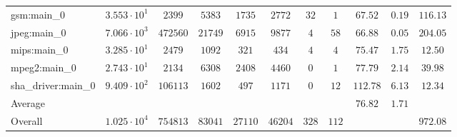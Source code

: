 \begin{tabular}{|l|c|c|c|c|c|c|c|c|c|c|}
gsm:main\_0             & $ 3.553 \cdot 10^{1} $ & $ 2399   $ & $ 5383  $ & $ 1735  $ & $ 2772  $ & $ 32  $ & $ 1   $ & $ 67.52       $ & $ 0.19    $ & $ 116.13  $ \\
jpeg:main\_0            & $ 7.066 \cdot 10^{3} $ & $ 472560 $ & $ 21749 $ & $ 6915  $ & $ 9877  $ & $ 4   $ & $ 58  $ & $ 66.88       $ & $ 0.05    $ & $ 204.05  $ \\
mips:main\_0            & $ 3.285 \cdot 10^{1} $ & $ 2479   $ & $ 1092  $ & $ 321   $ & $ 434   $ & $ 4   $ & $ 4   $ & $ 75.47       $ & $ 1.75    $ & $ 12.50   $ \\
mpeg2:main\_0           & $ 2.743 \cdot 10^{1} $ & $ 2134   $ & $ 6308  $ & $ 2408  $ & $ 4460  $ & $ 0   $ & $ 1   $ & $ 77.79       $ & $ 2.14    $ & $ 39.98   $ \\
sha\_driver:main\_0     & $ 9.409 \cdot 10^{2} $ & $ 106113 $ & $ 1602  $ & $ 497   $ & $ 1171  $ & $ 0   $ & $ 12  $ & $ 112.78      $ & $ 6.13    $ & $ 12.34   $ \\
\hline
Average                 & $                    $ & $        $ & $       $ & $       $ & $       $ & $     $ & $     $ & $ 76.82       $ & $ 1.71    $ & $         $ \\
\hline
Overall                 & $ 1.025 \cdot 10^{4} $ & $ 754813 $ & $ 83041 $ & $ 27110 $ & $ 46204 $ & $ 328 $ & $ 112 $ & $             $ & $         $ & $ 972.08  $ \\
\hline
\end{tabular}
